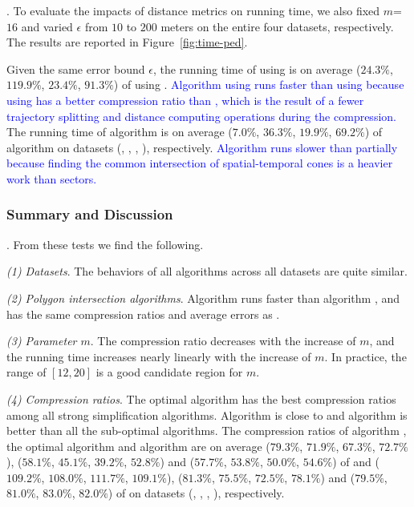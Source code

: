 {.
To evaluate the impacts of distance metrics on running time, we also fixed {$m$=$16$} and varied $\epsilon$ from $10$ to $200$ meters on the entire four datasets, respectively.
The results are reported in Figure~\ref{fig:time-ped}.

Given the same error bound $\epsilon$, the running time of \dpa  using \ped is on average
($24.3\%$, $119.9\%$, $23.4\%$, $91.3\%$) of \dpa  using \sed.
\textcolor{blue}{Algorithm \dpa using \ped runs faster than using \sed because \dpa using \ped has a better compression ratio than \sed, which is the result of a fewer trajectory splitting and distance computing operations during the compression.}
%
The running time of algorithm  is on average ($7.0\%$, $36.3\%$, $19.9\%$, $69.2\%$)
of algorithm \cist on datasets (\sercar, \geolife, \mopsi, \pricar), respectively.
\textcolor{blue}{Algorithm \cist runs slower than  partially because
finding the common intersection of spatial-temporal cones is a heavier work than sectors.
}




\subsubsection{Summary and Discussion}
. From these tests we find the following.

\sstab \emph{(1) Datasets}. The behaviors of all algorithms across all datasets are quite similar.

\sstab \emph{(2) Polygon intersection algorithms}. Algorithm \rpia runs faster than  algorithm \cpia, and has the same compression ratios and average errors as \cpia.

\sstab\emph{(3) Parameter $m$}. The compression ratio decreases with the increase of $m$, and the running time increases nearly linearly with the increase of $m$. In practice, the range of $[12, 20]$ is a good candidate region for $m$.

\sstab\emph{(4) Compression ratios}. The optimal \lsa algorithm has the best compression ratios among all strong simplification algorithms. Algorithm \cist is close to \dps and algorithm \cista is better than all the sub-optimal \lsa algorithms.
The compression ratios of algorithm \cist, the optimal algorithm and algorithm \cista are on average
($79.3\%$, $71.9\%$, $67.3\%$, $72.7\%$),
{($58.1\%$, $45.1\%$, $39.2\%$, $52.8\%$)} and ($57.7\%$, $53.8\%$, $50.0\%$, $54.6\%$) of \squishe
and ($109.2\%$, $108.0\%$, $111.7\%$, $109.1\%$), {($81.3\%$, $75.5\%$, $72.5\%$, $78.1\%$)} and ($79.5\%$, $81.0\%$, $83.0\%$, $82.0\%$) of \dps on {datasets} (\sercar, \geolife, \mopsi, \pricar), respectively.

}
